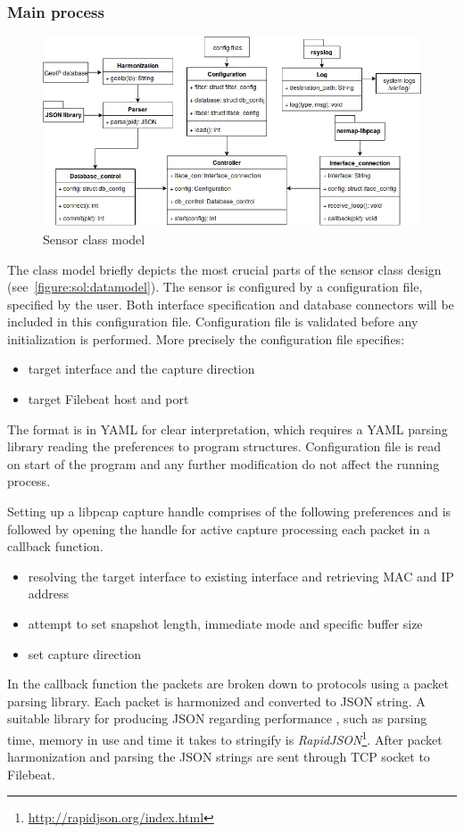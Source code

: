 \documentclass[12pt,a4paper,twoside]{report}
\begin{document}
			\subsubsection*{Main process} \label{solution:design:process}
				\begin{figure}[h]
					\centering
					\includegraphics[scale=0.57]{datamodel}
					\caption{Sensor class model}
					\label{figure:sol:datamodel}
				\end{figure}
				The class model briefly depicts the most crucial parts of the sensor class design (see~\autoref{figure:sol:datamodel}). The sensor is configured by a configuration file, specified by the user. Both interface specification and database connectors will be included in this configuration file. Configuration file is validated before any initialization is performed. More precisely the configuration file specifies:
				\begin{itemize}[noitemsep]
					\item target interface and the capture direction
					\item target Filebeat host and port
				\end{itemize}\par
				The format is in YAML for clear interpretation, which requires a YAML parsing library reading the preferences to program structures. Configuration file is read on start of the program and any further modification do not affect the running process.\par
				Setting up a libpcap capture handle comprises of the following preferences and is followed by opening the handle for active capture processing each packet in a callback function.\par
				\begin{itemize}[noitemsep]
					\item resolving the target interface to existing interface and retrieving MAC and IP address
					\item attempt to set snapshot length, immediate mode and specific buffer size
					\item set capture direction
				\end{itemize}\par
				In the callback function the packets are broken down to protocols using a packet parsing library. Each packet is harmonized and converted to JSON string. A suitable library for producing JSON regarding performance \cite{git:benchmark:json}, such as parsing time, memory in use and time it takes to stringify is \emph{RapidJSON}\footnote{\url{http://rapidjson.org/index.html}}. After packet harmonization and parsing the JSON strings are sent through TCP socket to Filebeat.
\end{document}
